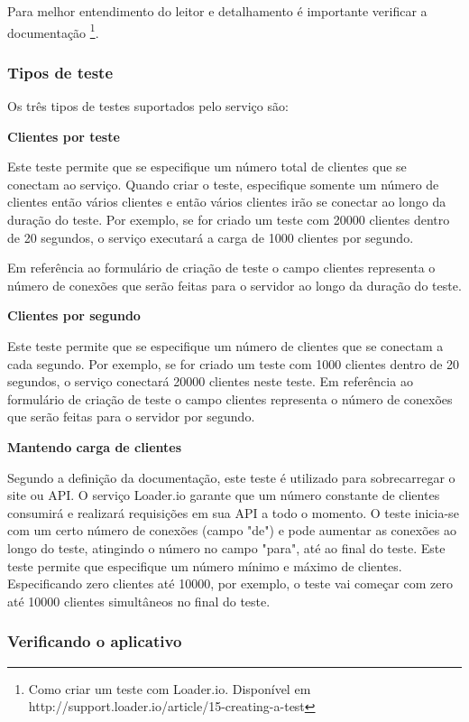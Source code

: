   Para melhor entendimento do leitor e detalhamento é importante verificar 
  a documentação \footnote{Como criar um teste com Loader.io. Disponível em http://support.loader.io/article/15-creating-a-test}.
  
\subsubsection{Tipos de teste}
  
  Os três tipos de testes suportados pelo serviço são:
  
  \textbf{Clientes por teste}
  
  Este teste permite que se especifique um número total de clientes que se conectam ao serviço. Quando criar o teste,
  especifique somente um número de clientes então vários clientes e então vários clientes irão se conectar ao longo da duração do teste. 
  Por exemplo, se for criado um teste com 20000 clientes dentro de 20 segundos, o serviço executará a carga de 
  1000 clientes por segundo.
  
  Em referência ao formulário de criação de teste o campo clientes representa o número de conexões que serão
  feitas para o servidor ao longo da duração do teste.
  
  \textbf{Clientes por segundo}
  
  Este teste permite que se especifique um número de clientes que se conectam a cada segundo. Por exemplo, se for criado
  um teste com 1000 clientes dentro de 20 segundos, o serviço conectará 20000 clientes neste teste.
  Em referência ao formulário de criação de teste o campo clientes representa o número de conexões que serão
  feitas para o servidor por segundo.
  
  \textbf{Mantendo carga de clientes}
  
  Segundo a definição da documentação, este teste é utilizado para sobrecarregar o site ou \ac{API}.
  O serviço Loader.io garante que um número constante de clientes consumirá e realizará requisições em 
  sua \ac{API} a todo o momento.
  O teste inicia-se com um certo número de conexões (campo "de") e pode aumentar as conexões ao longo do teste, 
  atingindo o número no campo "para", até ao final do teste. 
  Este teste permite que especifique um número mínimo e máximo de clientes. Especificando zero clientes
  até 10000, por exemplo, o teste vai começar com zero até 10000 clientes simultâneos no final do teste.
  
\subsubsection{Verificando o aplicativo}

